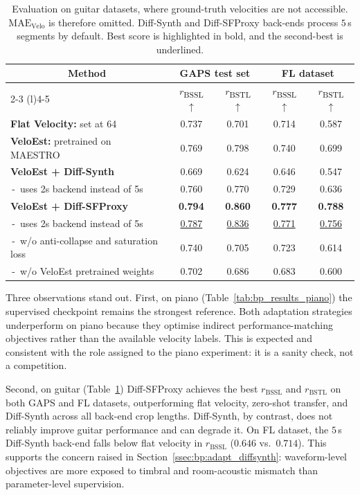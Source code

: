 \begin{table}[!htbp]
\caption{Evaluation on guitar datasets, where ground-truth velocities are not accessible. $\mathrm{MAE}_{\mathrm{Velo}}$ is therefore omitted. Diff-Synth and Diff-SFProxy back-ends process $5$\,s segments by default. Best score is highlighted in bold, and the second-best is underlined.}
\label{tab:bp_results_guitar}
\centering
\setlength{\tabcolsep}{15pt} 
\fontsize{10pt}{13pt}\selectfont 
\renewcommand{\arraystretch}{1.2}
\begin{tabular}{l||cc|cc}
\toprule
\multicolumn{1}{c||}{\multirow{2}{*}{\textbf{Method}}}
& \multicolumn{2}{c|}{\textbf{GAPS test set}}
& \multicolumn{2}{c}{\textbf{FL dataset}} \\
\cmidrule(lr){2-3} \cmidrule(l){4-5}
& $r$\textsubscript{BSSL} $\uparrow$
& $r$\textsubscript{BSTL} $\uparrow$
& $r$\textsubscript{BSSL} $\uparrow$
& $r$\textsubscript{BSTL} $\uparrow$ \\
\midrule
\textbf{Flat Velocity:} set at 64
& 0.737 & 0.701 & 0.714 & 0.587 \\
\textbf{VeloEst:} pretrained on MAESTRO
& 0.769 & 0.798 & 0.740 & 0.699 \\
\textbf{VeloEst + Diff-Synth}
& 0.669 & 0.624 & 0.646 & 0.547 \\
\,-\, uses 2s backend instead of 5s
& 0.760 & 0.770 & 0.729 & 0.636 \\
\midrule
\textbf{VeloEst + Diff-SFProxy}
& \textbf{0.794} & \textbf{0.860}
& \textbf{0.777} & \textbf{0.788} \\
\,-\, uses 2s backend instead of 5s
& \underline{0.787} & \underline{0.836}
& \underline{0.771} & \underline{0.756} \\
\,-\, w/o anti-collapse and saturation loss
& 0.740 & 0.705 & 0.723 & 0.614 \\
\,-\, w/o VeloEst pretrained weights
& 0.702 & 0.686 & 0.683 & 0.600 \\
\bottomrule
\end{tabular}
\end{table}

Three observations stand out. First, on piano (Table~\ref{tab:bp_results_piano}) the supervised checkpoint remains the strongest reference. Both adaptation strategies underperform on piano because they optimise indirect performance-matching objectives rather than the available velocity labels. This is expected and consistent with the role assigned to the piano experiment: it is a sanity check, not a competition.

Second, on guitar (Table~\ref{tab:bp_results_guitar}) Diff-SFProxy achieves the best $r_{\mathrm{BSSL}}$ and $r_{\mathrm{BSTL}}$ on both GAPS and FL datasets, outperforming flat velocity, zero-shot transfer, and Diff-Synth across all back-end crop lengths. Diff-Synth, by contrast, does not reliably improve guitar performance and can degrade it. On FL dataset, the $5$\,s Diff-Synth back-end falls below flat velocity in $r_{\mathrm{BSSL}}$ ($0.646$ vs.\ $0.714$). This supports the concern raised in Section~\ref{ssec:bp:adapt_diffsynth}: waveform-level objectives are more exposed to timbral and room-acoustic mismatch than parameter-level supervision.

